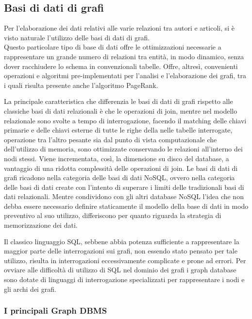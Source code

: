 \documentclass[a4paper, 12pt]{article}
\begin{document}
\subsection{Basi di dati di grafi}
Per l'elaborazione dei dati relativi alle varie relazioni tra autori e articoli, si è visto naturale l'utilizzo delle basi di dati di grafi. \\
Questo particolare tipo di base di dati offre le ottimizzazioni necessarie a rappresentare un grande numero di relazioni tra entità, in modo dinamico, senza dover racchiudere lo schema in convenzionali tabelle. Offre, altresì, convenienti operazioni e algoritmi pre-implementati per l'analisi e l'elaborazione dei grafi, tra i quali risulta presente anche l'algoritmo PageRank.
\par
La principale caratteristica che differenzia le basi di dati di grafi rispetto alle classiche basi di dati relazionali è che le operazioni di join, mentre nel modello relazionale sono svolte a tempo di interrogazione, facendo il matching delle chiavi primarie e delle chiavi esterne di tutte le righe della nelle tabelle interrogate, operazione tra l'altro pesante sia dal punto di vista computazionale che dell'utilizzo di memoria, sono ottimizzate conservando le relazioni all'interno dei nodi stessi. Viene incrementata, così, la dimensione su disco del database, a vantaggio di una ridotta complessità delle operazioni di join.
Le basi di dati di grafi ricadono nella categoria delle basi di dati NoSQL, ovvero nella categoria delle basi di dati create con l'intento di superare i limiti delle tradizionali basi di dati relazionali. Mentre condividono con gli altri database NoSQL l'idea che non debba essere necessario definire staticamente il modello della base di dati in modo preventivo al suo utilizzo, differiscono per quanto riguarda la strategia di memorizzazione dei dati.
\par
Il classico linguaggio SQL, sebbene abbia potenza sufficiente a rappresentare la maggior parte delle interrogazioni sui grafi, non essendo stato pensato per tale utilizzo, risulta in interrogazioni eccessivamente complicate e prone ad errori. Per ovviare alle difficoltà di utilizzo di SQL nel dominio dei grafi i graph database sono dotate di linguaggi di interrogazione specializzati per rappresentare i nodi e gli archi dei grafi.

\subsubsection{I principali Graph DBMS}
\end{document}
